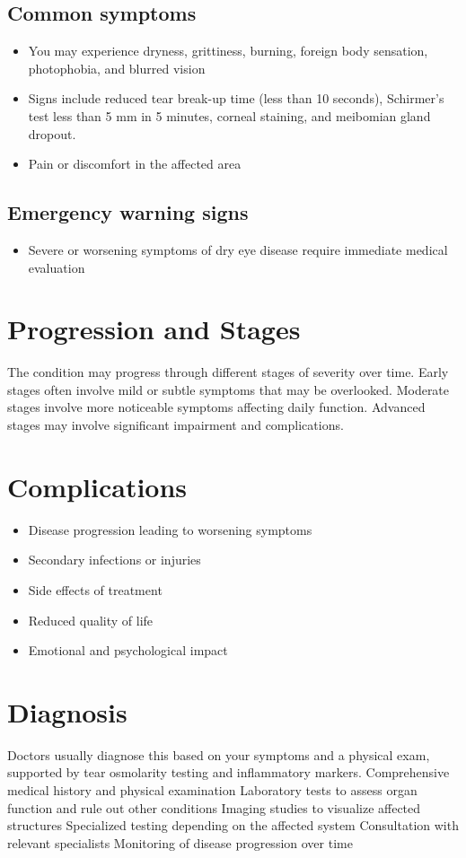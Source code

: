 \subsection{Common symptoms}
\begin{itemize}[noitemsep]
  \item You may experience dryness, grittiness, burning, foreign body sensation, photophobia, and blurred vision
  \item Signs include reduced tear break-up time (less than 10 seconds), Schirmer's test less than 5 mm in 5 minutes, corneal staining, and meibomian gland dropout.
  \item Pain or discomfort in the affected area
  \end{itemize}

\subsection{Emergency warning signs}
\begin{itemize}[noitemsep]
  \item Severe or worsening symptoms of dry eye disease require immediate medical evaluation
\end{itemize}
\section{Progression and Stages}
The condition may progress through different stages of severity over time. Early stages often involve mild or subtle symptoms that may be overlooked. Moderate stages involve more noticeable symptoms affecting daily function. Advanced stages may involve significant impairment and complications.
\section{Complications}
\begin{itemize}[noitemsep]
  \item Disease progression leading to worsening symptoms
  \item Secondary infections or injuries
  \item Side effects of treatment
  \item Reduced quality of life
  \item Emotional and psychological impact
\end{itemize}
\section{Diagnosis}
Doctors usually diagnose this based on your symptoms and a physical exam, supported by tear osmolarity testing and inflammatory markers. Comprehensive medical history and physical examination Laboratory tests to assess organ function and rule out other conditions Imaging studies to visualize affected structures Specialized testing depending on the affected system Consultation with relevant specialists Monitoring of disease progression over time

